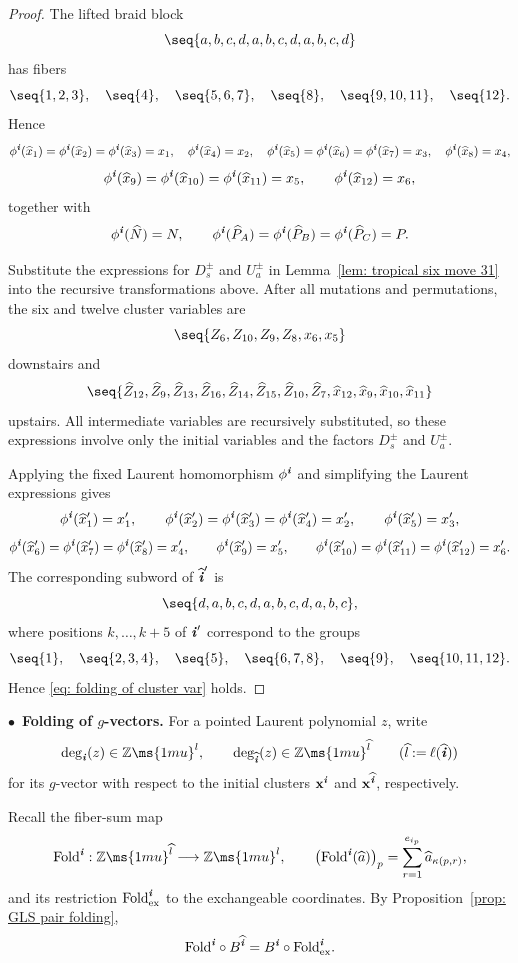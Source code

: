 \documentclass[12pt, leqno]{amsart}
\numberwithin{equation}{section}
\theoremstyle{plain}
\theoremstyle{definition}
\newcommand{\seteq}{\mathbin{:=}}
\newcommand{\ex}{\mathrm{ex}}
\newcommand{\Z}{\mathbb{Z}\ms{1mu}}
\newcommand{\Fold}{{\rm Fold}}
\newcommand{\ii}{ \textbf{\textit{i}}}
\newcommand{\hN}{\widehat{N}}
\newcommand{\hP}{\widehat{P}}
\newcommand{\hZ}{\widehat{Z}}
\newcommand{\ha}{\widehat{a}}
\newcommand{\hl}{\widehat{l}}
\newcommand{\hx}{\widehat{x}}
\newcommand{\hii}{{\widehat{\ii}}}
\newcommand{\bfx}{\mathbf{x}}
\begin{document}
\begin{proof}
   The lifted braid block 
\[
\seq{a,b,c,d,a,b,c,d,a,b,c,d}
\]
has fibers
\[
\seq{1,2,3},\quad \seq{4},\quad \seq{5,6,7},\quad \seq{8},\quad \seq{9,10,11},\quad \seq{12}.
\]
Hence
\[
\phi^\ii(\hx_1)=\phi^\ii(\hx_2)=\phi^\ii(\hx_3)=x_1,\quad
\phi^\ii(\hx_4)=x_2,\quad
\phi^\ii(\hx_5)=\phi^\ii(\hx_6)=\phi^\ii(\hx_7)=x_3,\quad
\phi^\ii(\hx_8)=x_4,
\]
\[
\phi^\ii(\hx_9)=\phi^\ii(\hx_{10})=\phi^\ii(\hx_{11})=x_5,
\qquad
\phi^\ii(\hx_{12})=x_6,
\]
together with
\[
\phi^\ii(\hN)=N,\qquad \phi^\ii(\hP_A)=\phi^\ii(\hP_B)=\phi^\ii(\hP_C)=P.
\]

Substitute  the expressions for $D_s^\pm$ and $U_a^\pm$ in
Lemma~\ref{lem: tropical six move 31} into the recursive
transformations above. After all mutations and permutations,  the six and twelve cluster variables are
\[
\seq{Z_6,Z_{10},Z_9,Z_8,x_6,x_5}
\]
downstairs and
\[
\seq{\hZ_{12},\hZ_9,\hZ_{13},\hZ_{16},\hZ_{14},\hZ_{15},
\hZ_{10},\hZ_7,\hx_{12},\hx_9,\hx_{10},\hx_{11}}
\]
upstairs. All intermediate variables are recursively substituted, so
these expressions involve only the initial variables and the factors
$D_s^\pm$ and $U_a^\pm$. \par
Applying  the fixed Laurent homomorphism $\phi^\ii$  and simplifying
the Laurent expressions gives
\[
\phi^\ii(\hx_1')=x_1',\qquad
\phi^\ii(\hx_2')=\phi^\ii(\hx_3')=\phi^\ii(\hx_4')=x_2',
\qquad
\phi^\ii(\hx_5')=x_3',
\]
\[
\phi^\ii(\hx_6')=\phi^\ii(\hx_7')=\phi^\ii(\hx_8')=x_4',
\qquad
\phi^\ii(\hx_9')=x_5',
\qquad
\phi^\ii(\hx_{10}')=\phi^\ii(\hx_{11}')=\phi^\ii(\hx_{12}')=x_6'.
\]
   The corresponding subword of $\hii'$ is 
\[
\seq{d,a,b,c,d,a,b,c,d,a,b,c},
\]
 where positions $k,\ldots,k+5$ of $\ii'$ correspond to the groups
\[
\seq{1},\quad \seq{2,3,4},\quad \seq{5},\quad \seq{6,7,8},\quad \seq{9},\quad \seq{10,11,12}.
\]
Hence \eqref{eq: folding of cluster var} holds.
\end{proof}

\medskip
\noindent
$\bullet$\ \textbf{Folding of $g$-vectors.}
For a pointed Laurent polynomial $z$, write
\[
\deg_\ii(z)\in\Z^l,
\qquad
\deg_\hii(z)\in\Z^{\hl} \qquad (\hl \seteq \ell(\hii))
\]
for its $g$-vector with respect to  the initial clusters 
$\bfx^\ii$ and $\bfx^\hii$, respectively.

Recall the fiber-sum map
\[
\Fold^\ii:\Z^{\hl}\longrightarrow\Z^l,
\qquad
\bigl(\Fold^\ii(\ha)\bigr)_p = \sum_{r=1}^{e_{i_p}}\ha_{\kappa(p,r)},
\]
and its restriction $\Fold^\ii_{\ex}$ to the exchangeable
coordinates.  By Proposition~\ref{prop: GLS pair folding},
\begin{equation}\label{eq: B intertwining g vector folding}
\Fold^\ii \circ B^\hii = B^\ii \circ \Fold^\ii_{\rm ex}.
\end{equation}
\end{document}
